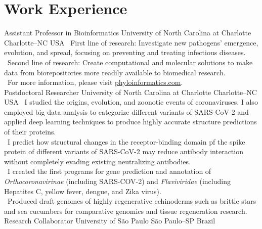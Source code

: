 \documentclass[11pt, letterpaper, sans]{moderncv}
\begin{document}
\section{Work Experience}
{Assistant Professor in Bioinformatics}
{University of North Carolina at Charlotte}
{Charlotte--NC}
{USA}
{
\textbullet~First line of research: Investigate new pathogens’ emergence, evolution, and spread, focusing on preventing and treating infectious diseases.\\
\textbullet~Second line of research: Create computational and molecular solutions to make data from biorepositories more readily available to biomedical research.\\
\textbullet~For more information, please visit \href{https://phyloinformatics.com/}{phyloinformatics.com}.\\
}
%
{Postdoctoral Researcher}
{University of North Carolina at Charlotte}
{Charlotte--NC}
{USA}
{
\textbullet~I studied the origins, evolution, and zoonotic events of coronaviruses. I also employed big data analysis to categorize different variants of SARS-CoV-2 and applied deep learning techniques to produce highly accurate structure predictions of their proteins.\\
\textbullet~I predict how structural changes in the receptor-binding domain pf the spike protein of different variants of SARS-CoV-2 may reduce antibody interaction without completely evading existing neutralizing antibodies.\\ %
\textbullet~I created the first programs for gene prediction and annotation of \textit{Orthocoronavirinae} (including SARS-COV-2) and \textit{Flaviviridae} (including Hepatites C, yellow fever, dengue, and Zika virus).\\ %
\textbullet~Produced draft genomes of highly regenerative echinoderms such as brittle stars and sea cucumbers for comparative genomics and tissue regeneration research.
}
%
{Research Collaborator}
{University of São Paulo}
{São Paulo--SP}
{Brazil}
\end{document}
